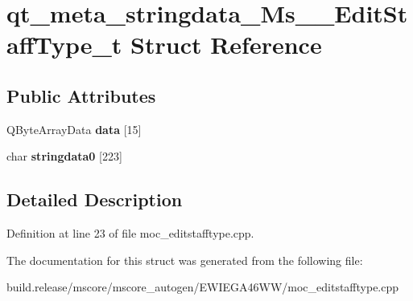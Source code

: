 \hypertarget{structqt__meta__stringdata___ms_____edit_staff_type__t}{}\section{qt\+\_\+meta\+\_\+stringdata\+\_\+\+Ms\+\_\+\+\_\+\+Edit\+Staff\+Type\+\_\+t Struct Reference}
\label{structqt__meta__stringdata___ms_____edit_staff_type__t}
\subsection*{Public Attributes}
\begin{DoxyCompactItemize}
\item 
\mbox{\label{structqt__meta__stringdata___ms_____edit_staff_type__t_a6d76b34e59641751340ce5ec4fb5c183}} 
Q\+Byte\+Array\+Data {\bfseries data} \mbox{[}15\mbox{]}
\item 
\mbox{\label{structqt__meta__stringdata___ms_____edit_staff_type__t_a23887be23340479761266282cf760e45}} 
char {\bfseries stringdata0} \mbox{[}223\mbox{]}
\end{DoxyCompactItemize}


\subsection{Detailed Description}


Definition at line 23 of file moc\+\_\+editstafftype.\+cpp.



The documentation for this struct was generated from the following file\+:\begin{DoxyCompactItemize}
\item 
build.\+release/mscore/mscore\+\_\+autogen/\+E\+W\+I\+E\+G\+A46\+W\+W/moc\+\_\+editstafftype.\+cpp\end{DoxyCompactItemize}
